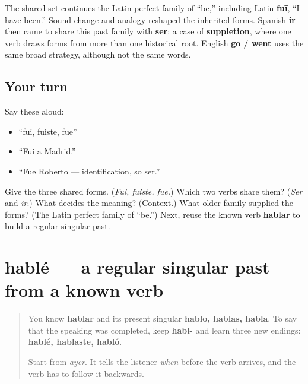 \begin{cousinweb}
The shared set continues the Latin perfect family of “be,” including Latin \textbf{fuī}, “I have been.” Sound change and analogy reshaped the inherited forms. Spanish \textbf{ir} then came to share this past family with \textbf{ser}: a case of \textbf{suppletion}, where one verb draws forms from more than one historical root. English \textbf{go / went} uses the same broad strategy, although not the same words.
\end{cousinweb}

\subsection*{Your turn}
Say these aloud:

\begin{itemize}
\raggedright
  \item “fui, fuiste, fue”
  \item “Fui a Madrid.”
  \item “Fue Roberto — identification, so ser.”
\end{itemize}

\begin{tcolorbox}[breakable,colback=teal!4,colframe=teal!35!black,title={Before you move on}]
Give the three shared forms. (\emph{Fui, fuiste, fue.}) Which two verbs share them? (\emph{Ser} and \emph{ir}.) What decides the meaning? (Context.) What older family supplied the forms? (The Latin perfect family of “be.”) Next, reuse the known verb \textbf{hablar} to build a regular singular past.
\end{tcolorbox}
\section[hablé]{hablé — a regular singular past from a known verb}

\label{lesson:ES-C14-hablar-preterite}



\begin{quote}
You know \textbf{hablar} and its present singular \textbf{hablo, hablas, habla}. To say that the speaking was completed, keep \textbf{habl-} and learn three new endings: \textbf{hablé, hablaste, habló}.

Start from \emph{ayer}. It tells the listener \emph{when} before the verb arrives, and the verb has to follow it backwards.
\end{quote}

